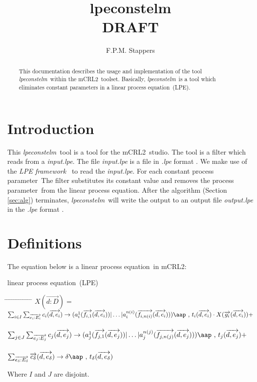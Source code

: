 \index{}\documentclass[a4paper,10pt]{article}
\title{lpeconstelm \\ DRAFT}
\author{F.P.M. Stappers}
\theoremstyle{plain}
\theoremstyle{definition}
\newcommand{\lpe}{linear process equation}
\newcommand{\tool}{\textit{lpeconstelm}}
\newcommand{\ovr}{\overrightarrow}
\newcommand{\mcrl}{mCRL2}
\newcommand{\framework}{\textit{LPE framework} \cite{LPEframework}}
\newcommand{\pp}{process parameter}
\newcommand{\ti}{\textit}
\newcommand{\tab}{\hspace*{5.mm} \= \hspace*{5.mm} \= \hspace*{5.mm} \= \hspace*{5.mm} \= \hspace*{5.mm} \= \hspace*{5.mm}  \= \hspace*{5.mm}  \= \hspace*{5.mm}  \= \hspace*{5.mm} \= \hspace*{5.mm} \= \hspace*{5.mm}  \= \hspace*{5.mm}  \= \hspace*{5.mm}\kill}
\newcommand{\at}[1]{\mbox{\aap ,} #1}
\begin{document}
\maketitle

\begin{abstract}
This documentation describes the usage and implementation of the tool \tool\ within the \mcrl\ toolset.
Basically, \tool\ is a tool which eliminates constant parameters in a \lpe\ (LPE).
\end{abstract}

\tableofcontents

\section{Introduction}
This \tool\ tool is a tool for the \mcrl\ studio. The tool is a
filter which reads from a \ti{input.lpe}. The file \ti{input.lpe} is
a file in \ti{.lpe} format \cite{LPEformat}. We make use of the
\framework\ to read the \ti{input.lpe}. For
each constant \pp\ The filter substitutes its constant value and removes the \pp\ from the
\lpe . After the algorithm (Section \ref{sec:alg}) terminates, \tool\
will write the output to an output file \ti{output.lpe} in the \ti{.lpe} format \cite{LPEformat}.

\section{Definitions} \label{sec:def}

The equation below is a \lpe\ in \mcrl : 
\begin{defn}\lpe\ (LPE) \newline
\begin{tabbing}
\tab
$X (\ovr{d: D}) = $ \> \> \> $ \sum_{i \in I} \sum_{\ovr{e_i: E_i}} c_i ( \ovr{d, e_i }) \rightarrow 
(a_i^1 (\ovr{f_{i,1}}(\ovr{d,e_i})) \vert \ldots \vert a_i^{n(i)}(\ovr{f_{i,n(i)}}(\ovr{d,e_i}))) \at \text{ } t_i(\ovr{d,e_i})  \cdot X(\ovr{g_i}(\ovr{d,e_i})) +$ \\ \\
\> \> \> $ \sum_{j \in J} \sum_{\ovr{e_j: E_j}} c_j ( \ovr{d, e_j} ) \rightarrow 
(a_j^1 (\ovr{f_{j,1}}(\ovr{d,e_j})) \vert \ldots \vert a_j^{n(j)}(\ovr{f_{j,n(j)}}(\ovr{d,e_j}))) \at \text{ } t_j(\ovr{d,e_j}) + $ \\ \\
\> \> \> $\sum_{\ovr{e_\delta:E_\delta}} \ovr{c_\delta} ( \ovr{d, e_\delta}) \rightarrow 
\delta \at \text{ } t_\delta(\ovr{d,e_\delta})$ 
\end{tabbing}

Where $I$ and $J$ are disjoint.\\
\end{defn}
\end{document}
